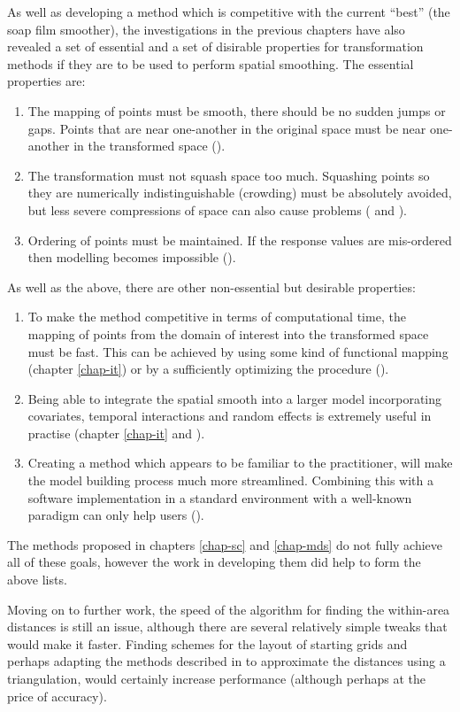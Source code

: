 As well as developing a method which is competitive with the current ``best'' (the soap film smoother), the investigations in the previous chapters have also revealed a set of essential and a set of disirable properties for transformation methods if they are to be used to perform spatial smoothing. The essential properties are:
\begin{enumerate}
\item The mapping of points must be smooth, there should be no sudden jumps or gaps. Points that are near one-another in the original space must be near one-another in the transformed space ().
\item The transformation must not squash space too much. Squashing points so they are numerically indistinguishable (crowding) must be absolutely avoided, but less severe compressions of space can also cause problems ( and ).
\item Ordering of points must be maintained. If the response values are mis-ordered then modelling becomes impossible ().
\end{enumerate}
As well as the above, there are other non-essential but desirable properties:
\begin{enumerate}
\item To make the method competitive in terms of computational time, the mapping of points from the domain of interest into the transformed space must be fast. This can be achieved by using some kind of functional mapping (chapter \ref{chap-it}) or by a sufficiently optimizing the procedure ().
\item Being able to integrate the spatial smooth into a larger model incorporating covariates, temporal interactions and random effects is extremely useful in practise (chapter \ref{chap-it} and ).
\item Creating a method which appears to be familiar to the practitioner, will make the model building process much more streamlined. Combining this with a software implementation in a standard environment with a well-known paradigm can only help users ().
\end{enumerate}

The methods proposed in chapters \ref{chap-sc} and \ref{chap-mds} do not fully achieve all of these goals, however the work in developing them did help to form the above lists. 

Moving on to further work, the speed of the algorithm for finding the within-area distances is still an issue, although there are several relatively simple tweaks that would make it faster. Finding schemes for the layout of starting grids and perhaps adapting the methods described in  to approximate the distances using a triangulation, would certainly increase performance (although perhaps at the price of accuracy).


